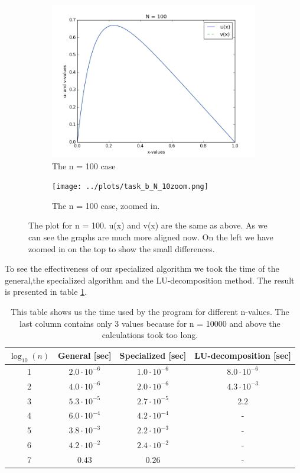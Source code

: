 \documentclass[12pt,a4paper]{article}
\newcommand{\E}[1]{\cdot 10^{#1}}
\begin{document}
\begin{figure}[H]
\centering
\begin{subfigure}{0.3\textwidth}
	\includegraphics[scale=0.35]{../plots/task_b_N_100.png}
	\caption{The n = 100 case}	
	\label{fig:N100}
\end{subfigure}
\qquad \qquad \qquad
\begin{subfigure}{0.3\textwidth}
	\texttt{[image: ../plots/task\_b\_N\_10zoom.png]}
	\caption{The n = 100 case, zoomed in.}
	\label{fig:N100Zoom}
\end{subfigure}
\caption{The plot for n = 100. u(x) and v(x) are the same as above. As we can see the graphs are much more aligned now. On the left we have zoomed in on the top to show the small differences.}
\label{fig:N100S}
\end{figure}
To see the effectiveness of our specialized algorithm we took the time of the general,the specialized algorithm and the LU-decomposition method. The result is presented in table \ref{tab:time}.
\begin{table}[H]
\centering
\begin{tabular}{|c|c|c|c|} \hline
$\log_{10}(n)$ & General [sec] & Specialized [sec] & LU-decomposition [sec] \\ \hline
1 &  $2.0\E{-6}$ & $1.0\E{-6}$ & $8.0\E{-6}$ \\ \hline
2 &  $4.0\E{-6}$ & $2.0\E{-6}$ & $4.3\E{-3}$ \\ \hline
3 &  $5.3\E{-5}$ & $2.7\E{-5}$ & $2.2$ \\ \hline
4 &  $6.0\E{-4}$ & $4.2\E{-4}$ & - \\ \hline
5 &  $3.8\E{-3}$ & $2.2\E{-3}$ & - \\ \hline
6 &  $4.2\E{-2}$ & $2.4\E{-2}$ & - \\ \hline
7 &  $0.43$       & $0.26$     & - \\ \hline
\end{tabular}
\caption{This table shows us the time used by the program for different n-values. The last column contains only 3 values because for n = 10000 and above the calculations took too long.}
\label{tab:time}
\end{table}
\end{document}
